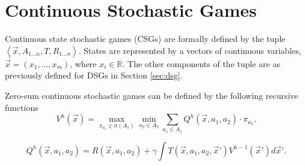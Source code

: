 \section{Continuous Stochastic Games}
\label{sec:csg}

Continuous state stochastic games (CSGs) are formally defined by the tuple \\
$ \left\langle \vec{x}, A_{1 \ldots n}, T, R_{1 \ldots n} \right\rangle $.
States are represented by a vectors of continuous variables, $\vec{x} = \left(x_1, \ldots, x_m \right)$, 
where $x_i \in \mathbb{R}$. The other components of the tuple are
as previously defined for DSGs in Section \ref{sec:dsg}.

Zero-sum continuous stochastic games can be defined by the following
recursive functions
\begin{equation}
\label{eq:csgvfunccompact}
  V^{h}(\vec{x}) = \max_{\pi_{a_1} \in \sigma(A_1)} \min_{a_2 \in A_2} \sum_{a_1 \in A_1} Q^{h}(\vec{x}, a_1, a_2) \cdot \pi_{a_1}.
\end{equation}

\begin{equation}
\label{eq:csgdiscqfunc}
  Q^{h}(\vec{x}, a_1, a_2) = R(\vec{x}, a_1, a_2) + \gamma \int T(\vec{x}, a_1, a_2, \vec{x}') V^{h-1}(\vec{x}') d\vec{x}' .
\end{equation}


%
%
%
%
%

